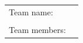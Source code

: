 \pagestyle{fancy}
\setlength{\voffset}{-10pt}
\setlength\headheight{70.0pt}
\renewcommand{\headrulewidth}{0pt}
\cfoot{}
\lfoot{}
\rfoot{}
\begin{center}
	{\department}

	\vspace{4cm}
	\makeThesisTitle %
	~\\~\\

	\makeThesisType

	~\\\vspace{6.5cm}

	\begin{tabular}{p{.3\linewidth}p{.5\linewidth}}
		{\hfill Team name:} & {\bf \thesisauthor} \\
		&\\
		{\parbox[t]{\linewidth}{\hfill Team members:}}& {\bf \thesissupervisor}\\
	\end{tabular}

	\vspace{3cm}
	{\bf \thesisyear}
\end{center}

